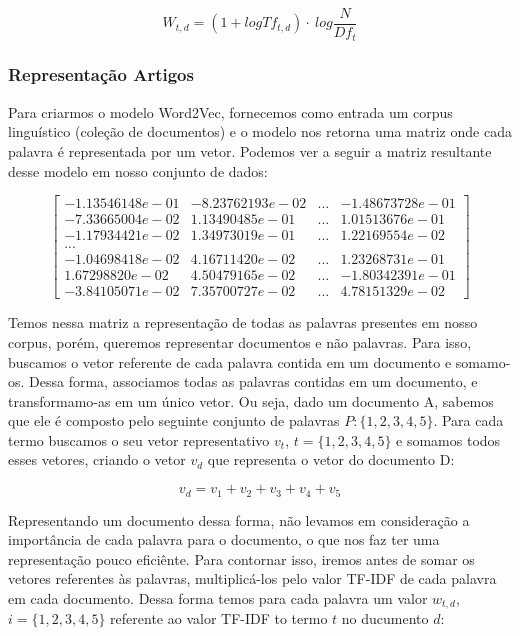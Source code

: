 \documentclass[a4paper,12pt]{article}
\begin{document}
  $$ W_{t,d} = (1 + log Tf_{t,d}) \cdot \ log \dfrac{N}{Df_{t}}$$
  
    
  
\subsubsection{Representação Artigos}

  Para criarmos o modelo Word2Vec, fornecemos como entrada um corpus linguístico (coleção de documentos) e o modelo nos retorna uma matriz
  onde cada palavra é representada por um vetor. Podemos ver a seguir a matriz resultante desse modelo em nosso conjunto de dados:
  
  $$\begin{bmatrix}
     -1.13546148e-01 & -8.23762193e-02 & ... & -1.48673728e-01\\
     -7.33665004e-02 &  1.13490485e-01 & ... &  1.01513676e-01\\
     -1.17934421e-02 & 1.34973019e-01  & ... &  1.22169554e-02\\
     ... & & &  \\
     -1.04698418e-02 & 4.16711420e-02 & ... &  1.23268731e-01\\
      1.67298820e-02 &   4.50479165e-02 & ... & -1.80342391e-01\\
     -3.84105071e-02 &   7.35700727e-02 & ... &  4.78151329e-02
    \end{bmatrix}
 $$
 
  Temos nessa matriz a representação de todas as palavras presentes em nosso corpus, porém, queremos representar documentos e não palavras.
  Para isso, buscamos o vetor referente de cada palavra contida em um documento e somamo-os. Dessa forma, associamos todas as palavras contidas
  em um documento, e transformamo-as em um único vetor. Ou seja, dado um documento A, sabemos que ele é composto pelo seguinte conjunto de palavras
  $P:\{1,2,3,4,5\}$. Para cada termo buscamos o seu vetor representativo $v_{t}$, $t =\{1,2,3,4,5\}$ e somamos todos esses vetores, criando o vetor
  $v_{d}$ que representa o vetor do documento D:
  
  $$v_{d} = v_{1}+v_{2}+v_{3}+v_{4}+v_{5} $$
  
  Representando um documento dessa forma, não levamos em consideração a importância de cada palavra para o documento, o que nos faz ter
  uma representação pouco eficiênte. Para contornar isso, iremos antes de somar os vetores referentes às palavras, multiplicá-los 
  pelo valor TF-IDF de cada palavra em cada documento. Dessa forma temos para cada palavra um valor $w_{t,d}$, $i=\{1,2,3,4,5\}$ referente
  ao valor TF-IDF to termo $t$ no ducumento $d$:
  
\end{document}
